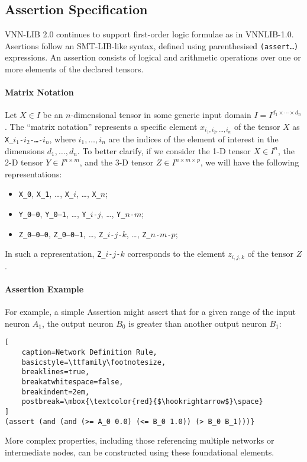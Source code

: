 \subsection{Assertion Specification}
VNN-LIB 2.0 continues to support first-order logic formulae as in VNNLIB-1.0. Asertions follow an SMT-LIB-like syntax, defined using parenthesised 
\texttt{(assert\ldots)} expressions. An assertion consists of logical and arithmetic operations over one or more elements of the declared tensors.

\paragraph{Matrix Notation}
Let $X \in I$ be an $n$-dimensional tensor in some generic input domain $I = I^{d_1 \times \cdots \times d_n}$. The ``matrix notation'' represents a specific 
element $x_{i_1, i_2, \dots, i_n}$ of the tensor $X$ as \texttt{X\_$i_1$-$i_2$-\dots-$i_n$}, where $i_1, \dots, i_n$ are the indices of the element of interest in the 
dimensions $d_1, \dots, d_n$. To better clarify, if we consider the 1-D tensor $X \in I^n$, the 2-D tensor $Y \in I^{n \times m}$, and the 3-D tensor 
$Z \in I^{n \times m \times p}$, we will have the following representations:
\begin{itemize}
    \item \texttt{X\_0}, \texttt{X\_1}, \dots, \texttt{X\_$i$}, \dots, \texttt{X\_$n$};
    \item \texttt{Y\_0--0}, \texttt{Y\_0--1}, \dots, \texttt{Y\_$i$-$j$}, \dots, \texttt{Y\_$n$-$m$};
    \item \texttt{Z\_0--0--0}, \texttt{Z\_0--0--1}, \dots, \texttt{Z\_$i$-$j$-$k$}, \dots, \texttt{Z\_$n$-$m$-$p$};
\end{itemize}
In such a representation, \texttt{Z\_$i$-$j$-$k$} corresponds to the element $z_{i,j,k}$ of the tensor $Z$. 

\paragraph{Assertion Example}
For example, a simple Assertion might assert that for a given range of the input neuron $A_1$, the output neuron $B_0$ 
is greater than another output neuron $B_1$:
\begin{lstlisting}[
    caption=Network Definition Rule, 
    basicstyle=\ttfamily\footnotesize,
    breaklines=true,               
    breakatwhitespace=false,       
    breakindent=2em,                
    postbreak=\mbox{\textcolor{red}{$\hookrightarrow$}\space} 
]
(assert (and (and (>= A_0 0.0) (<= B_0 1.0)) (> B_0 B_1)))}
\end{lstlisting}
More complex properties, including those referencing multiple networks or intermediate nodes, can be constructed using these foundational elements.
